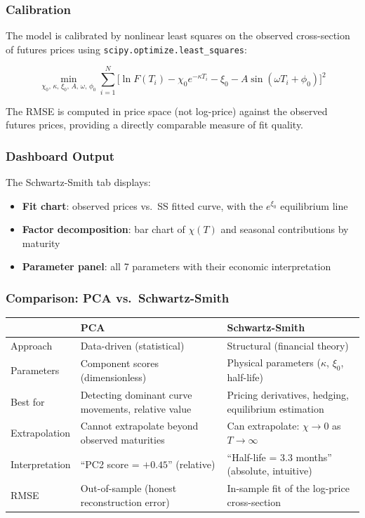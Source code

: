 \documentclass[11pt,a4paper]{article}
\begin{document}
\subsubsection{Calibration}

The model is calibrated by nonlinear least squares on the observed cross-section
of futures prices using \texttt{scipy.optimize.least\_squares}:

\begin{equation}
\min_{\chi_0,\, \kappa,\, \xi_0,\, A,\, \omega,\, \phi_0}
\sum_{i=1}^{N} \bigl[\ln F(T_i) - \chi_0 e^{-\kappa T_i} - \xi_0
                     - A\sin(\omega T_i + \phi_0)\bigr]^2
\end{equation}

The RMSE is computed in price space (not log-price) against the observed futures prices,
providing a directly comparable measure of fit quality.

\subsubsection{Dashboard Output}

The Schwartz-Smith tab displays:
\begin{itemize}[itemsep=3pt]
\item \textbf{Fit chart}: observed prices vs.\ SS fitted curve, with the $e^{\xi_0}$
      equilibrium line
\item \textbf{Factor decomposition}: bar chart of $\chi(T)$ and seasonal contributions
      by maturity
\item \textbf{Parameter panel}: all 7 parameters with their economic interpretation
\end{itemize}

\subsubsection{Comparison: PCA vs.\ Schwartz-Smith}

\begin{center}
\begin{tabularx}{\textwidth}{l X X}
\toprule
& \textbf{PCA} & \textbf{Schwartz-Smith} \\
\midrule
Approach      & Data-driven (statistical) & Structural (financial theory) \\
Parameters    & Component scores (dimensionless) & Physical parameters ($\kappa$, $\xi_0$, half-life) \\
Best for      & Detecting dominant curve movements, relative value & Pricing derivatives, hedging, equilibrium estimation \\
Extrapolation & Cannot extrapolate beyond observed maturities & Can extrapolate: $\chi \to 0$ as $T \to \infty$ \\
Interpretation & ``PC2 score = $+0.45$'' (relative) & ``Half-life = 3.3 months'' (absolute, intuitive) \\
RMSE          & Out-of-sample (honest reconstruction error) & In-sample fit of the log-price cross-section \\
\bottomrule
\end{tabularx}
\end{center}
\end{document}
